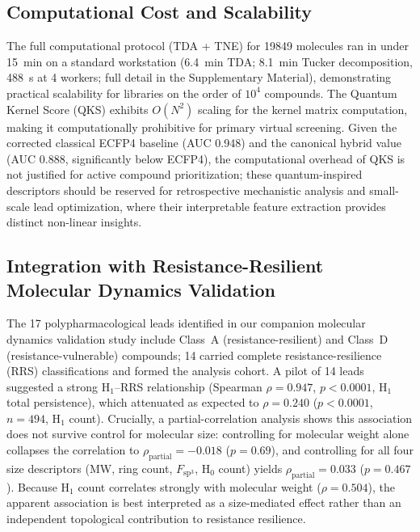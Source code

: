 \documentclass[11pt,a4paper]{article}
\begin{document}
\subsection{Computational Cost and Scalability}

The full computational protocol (TDA + TNE) for \num{19849} molecules ran in under \SI{15}{\minute} on a standard workstation (\SI{6.4}{\minute} TDA; \SI{8.1}{\minute} Tucker decomposition, \SI{488}{\second} at 4 workers; full detail in the Supplementary Material), demonstrating practical scalability for libraries on the order of $10^4$ compounds. The Quantum Kernel Score (QKS) exhibits $O(N^2)$ scaling for the kernel matrix computation, making it computationally prohibitive for primary virtual screening. Given the corrected classical ECFP4 baseline (AUC \num{0.948}) and the canonical hybrid value (AUC \num{0.888}, significantly below ECFP4), the computational overhead of QKS is not justified for active compound prioritization; these quantum-inspired descriptors should be reserved for retrospective mechanistic analysis and small-scale lead optimization, where their interpretable feature extraction provides distinct non-linear insights.

\subsection{Integration with Resistance-Resilient Molecular Dynamics Validation}

The 17 polypharmacological leads identified in our companion molecular dynamics validation study \citep{temgoua2027md} include Class~A (resistance-resilient) and Class~D (resistance-vulnerable) compounds; 14 carried complete resistance-resilience (RRS) classifications and formed the analysis cohort. A pilot of 14 leads suggested a strong H$_1$--RRS relationship (Spearman $\rho = \num{0.947}$, $p < \num{0.0001}$, H$_1$ total persistence), which attenuated as expected to $\rho = \num{0.240}$ ($p < \num{0.0001}$, $n = \num{494}$, H$_1$ count). Crucially, a partial-correlation analysis shows this association does not survive control for molecular size: controlling for molecular weight alone collapses the correlation to $\rho_{\text{partial}} = -\num{0.018}$ ($p = \num{0.69}$), and controlling for all four size descriptors (MW, ring count, $F_{\mathrm{sp}^3}$, H$_0$ count) yields $\rho_{\text{partial}} = \num{0.033}$ ($p = \num{0.467}$). Because H$_1$ count correlates strongly with molecular weight ($\rho = \num{0.504}$), the apparent association is best interpreted as a size-mediated effect rather than an independent topological contribution to resistance resilience.
\end{document}
